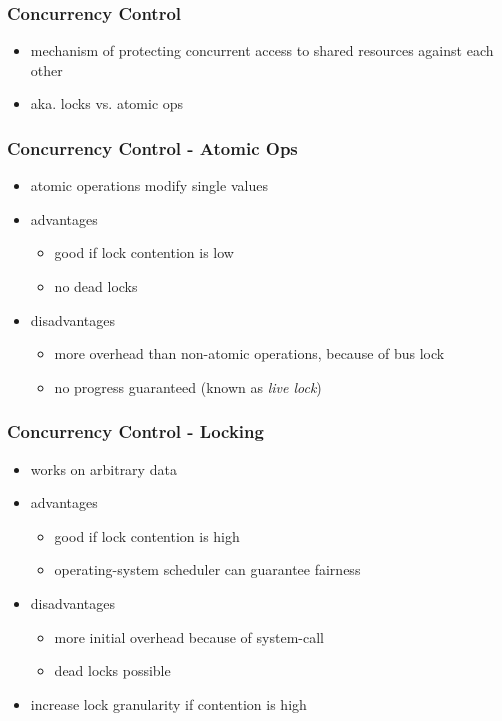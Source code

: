 \begin{frame}
 \frametitle{Concurrency Control}
 \begin{itemize}
  \item mechanism of protecting concurrent access to shared resources against each other
  \item aka. locks vs. atomic ops
 \end{itemize}
\end{frame}

\begin{frame}
 \frametitle{Concurrency Control - Atomic Ops}
 \begin{itemize}
  \item atomic operations modify single values
  \item advantages
   \begin{itemize}
    \item good if lock contention is low
    \item no dead locks
   \end{itemize}
  \item disadvantages
   \begin{itemize}
    \item more overhead than non-atomic operations, because of bus lock
    \item no progress guaranteed (known as \textit{live lock})
   \end{itemize}
 \end{itemize}
\end{frame}

\begin{frame}
 \frametitle{Concurrency Control - Locking}
 \begin{itemize}
  \item works on arbitrary data
  \item advantages
   \begin{itemize}
    \item good if lock contention is high
    \item operating-system scheduler can guarantee fairness
   \end{itemize}
  \item disadvantages
   \begin{itemize}
    \item more initial overhead because of system-call
    \item dead locks possible
   \end{itemize}
  \item increase lock granularity if contention is high
 \end{itemize}
\end{frame}

